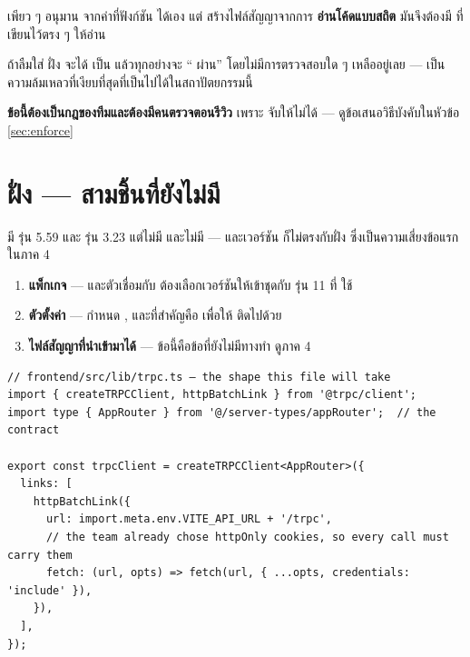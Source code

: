 \begin{warnbox}[title={\code{nestjs-trpc} ต้องระบุ \code{output} เอง ไม่งั้นสัญญาไร้ความหมาย}]
 เพียว ๆ อนุมาน  จากค่าที่ฟังก์ชัน  ได้เอง แต่
 สร้างไฟล์สัญญาจากการ \textbf{อ่านโค้ดแบบสถิต} มันจึงต้องมี
 ที่เขียนไว้ตรง ๆ ให้อ่าน

ถ้าลืมใส่  ฝั่ง  จะได้  เป็น 
แล้วทุกอย่างจะ `` ผ่าน'' โดยไม่มีการตรวจสอบใด ๆ เหลืออยู่เลย ---
เป็นความล้มเหลวที่เงียบที่สุดที่เป็นไปได้ในสถาปัตยกรรมนี้

\textbf{ข้อนี้ต้องเป็นกฎของทีมและต้องมีคนตรวจตอนรีวิว } เพราะ 
จับให้ไม่ได้ --- ดูข้อเสนอวิธีบังคับในหัวข้อ \ref{sec:enforce}
\end{warnbox}

\section{ฝั่ง  --- สามชิ้นที่ยังไม่มี}

\begin{goodbox}[title={ตรวจสอบกับรีโปแล้ว: \code{frontend/package.json} ยังไม่มีแพ็กเกจของ \en{tRPC} เลย}]
มี  รุ่น 5.59 และ  รุ่น 3.23 แต่ไม่มี
 และไม่มี  --- และเวอร์ชัน
 ก็ไม่ตรงกับฝั่ง  ซึ่งเป็นความเสี่ยงข้อแรกในภาค 4
\end{goodbox}

\begin{enumerate}
\item \textbf{แพ็กเกจ} ---  และตัวเชื่อมกับ 
      ต้องเลือกเวอร์ชันให้เข้าชุดกับ  รุ่น 11 ที่  ใช้
\item \textbf{ตัวตั้งค่า } --- กำหนด ,  และที่สำคัญคือ
       เพื่อให้  ติดไปด้วย
\item \textbf{ไฟล์สัญญาที่นำเข้ามาได้} --- ข้อนี้คือข้อที่ยังไม่มีทางทำ ดูภาค 4
\end{enumerate}

\begin{lstlisting}
// frontend/src/lib/trpc.ts — the shape this file will take
import { createTRPCClient, httpBatchLink } from '@trpc/client';
import type { AppRouter } from '@/server-types/appRouter';  // the contract

export const trpcClient = createTRPCClient<AppRouter>({
  links: [
    httpBatchLink({
      url: import.meta.env.VITE_API_URL + '/trpc',
      // the team already chose httpOnly cookies, so every call must carry them
      fetch: (url, opts) => fetch(url, { ...opts, credentials: 'include' }),
    }),
  ],
});
\end{lstlisting}

